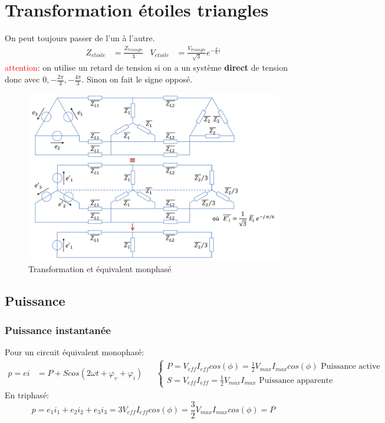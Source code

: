 \documentclass{report}
\begin{document}
\section{Transformation étoiles triangles}
On peut toujours passer de l'un à l'autre.
\begin{align*}
Z_{etoile} &= \frac{Z_{triangle}}{3} & V_{etoile} &= \frac{V_{triangle}}{\sqrt{3}}e^{- \frac{\pi}{6}i}
\end{align*}
\textcolor{red}{attention}: on utilise un retard de tension si on a un système \textbf{direct} de tension donc avec $0, - \frac{2 \pi}{3}, - \frac{4 \pi}{3}$. Sinon on fait le signe opposé.
\begin{figure}[H]
\centering
\includegraphics[width=12cm]{img/transfoEtoilesTriangles.png}
\caption{Transformation et équivalent monphasé}
\end{figure}

\subsection{Puissance}
\subsubsection{Puissance instantanée}
Pour un circuit équivalent monophasé:
\begin{align*}
p = ei &= P + S cos(2 \omega t + \varphi_v + \varphi_i) & &\begin{cases}
P = V_{eff}I_{eff} cos(\phi) = \frac{1}{2} V_{max} I_{max} cos(\phi) \text{     Puissance active}\\
S = V_{eff}I_{eff} = \frac{1}{2} V_{max} I_{max} \text{      Puissance apparente}
\end{cases}
\end{align*}
En triphasé:
\begin{equation}
p = e_1 i_1 + e_2 i_2 + e_3 i_3 = 3 V_{eff} I_{eff} cos(\phi) = \frac{3}{2} V_{max} I_{max} cos(\phi) = P
\end{equation}
\end{document}
